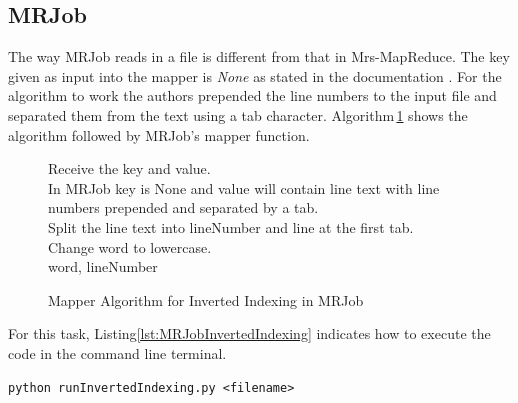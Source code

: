 \documentclass[10pt, twocolumn]{article}
\makeatletter
\newcommand{\removelatexerror}{\let\@latex@error\@gobble}
\makeatother
\begin{document}
\subsection{MRJob}
%
The way MRJob reads in a file is different from that in Mrs-MapReduce. The key given as input into the mapper is \emph{None} as stated in the documentation \cite{ELEN4020A_REF:MRJob067}. For the algorithm to work the authors prepended the line numbers to the input file and separated them from the text using a tab character. Algorithm\,\ref*{Alg:MapperMRJobInvertedIndexing} shows the algorithm followed by MRJob's mapper function.
%
\begin{figure}[H]
     \removelatexerror
    \begin{algorithm}[H]
       \label{Alg:MapperMRJobInvertedIndexing}
        \caption{Mapper Algorithm for Inverted Indexing in MRJob}
        Receive the key and value.\\
        In MRJob key is None and value will contain line text with line numbers prepended and separated by a tab.\\
        Split the line text into lineNumber and line at the first tab.\\
        {   
            Change word to lowercase.\\
            {
                \Return word, lineNumber
            }
        }
    \end{algorithm}
\end{figure}
%
\noindent For this task, Listing\ref*{lst:MRJobInvertedIndexing} indicates how to execute the code in the command line terminal.
%
\begin{center}
\begin{minipage}{0.99\columnwidth}
\begin{lstlisting}[style=bashStyle, label=lst:MRJobInvertedIndexing, caption = Command to execute Inverted Indexing using MRJob]
python runInvertedIndexing.py <filename>
\end{lstlisting}
\end{minipage}
\end{center}
%
%
%
\end{document}

